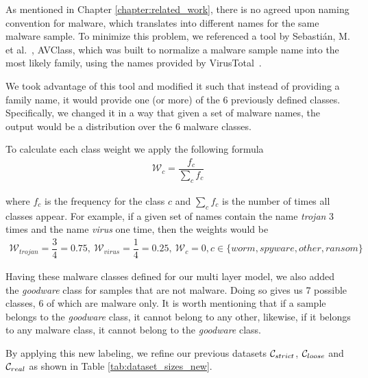As mentioned in Chapter \ref{chapter:related_work}, there is no agreed upon naming convention for malware, which translates into different names for the same malware sample.
To minimize this problem, we referenced a tool by Sebastián, M. et al.~\cite{sebastian2016avclass}, AVClass, which was built to normalize a malware sample name into the most likely family, using the names provided by VirusTotal~\cite{tool:virustotal}.

We took advantage of this tool and modified it such that instead of providing a family name, it would provide one (or more) of the 6 previously defined classes.
Specifically, we changed it in a way that given a set of malware names, the output would be a distribution over the 6 malware classes.

To calculate each class weight we apply the following formula
\begin{eqnarray*}
	\mathcal{W}_c = \dfrac{f_c}{\sum\limits_{c}f_c}
\end{eqnarray*}

where $f_c$ is the frequency for the class $c$ and $\sum_{c}f_c$ is the number of times all classes appear.
For example, if a given set of names contain the name \textit{trojan} 3 times and the name \textit{virus} one time, then the weights would be
\begin{eqnarray*}
	\mathcal{W}_{trojan}=\dfrac{3}{4}=0.75,~\mathcal{W}_{virus}=\dfrac{1}{4}=0.25,~ \mathcal{W}_{c}=0, c \in \{worm, spyware, other, ransom\}
\end{eqnarray*}

\medskip

Having these malware classes defined for our multi layer model, we also added the \textit{goodware} class for samples that are not malware.
Doing so gives us 7 possible classes, 6 of which are malware only.
It is worth mentioning that if a sample belongs to the \textit{goodware} class, it cannot belong to any other, likewise, if it belongs to any malware class, it cannot belong to the \textit{goodware} class.

By applying this new labeling, we refine our previous datasets $\mathcal{C}_{strict}$, $\mathcal{C}_{loose}$ and $\mathcal{C}_{real}$ as shown in Table \ref{tab:dataset_sizes_new}.

